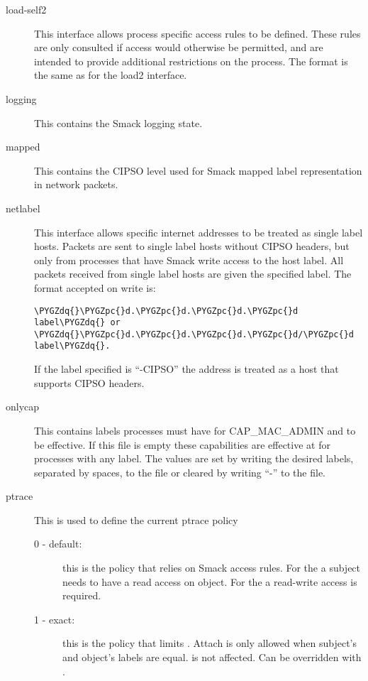 \documentclass[a4paper,8pt,english]{sphinxmanual}
\def\PYGZpc{\char`\%}
\def\PYGZdq{\char`\"}
\begin{document}
\begin{description}
\item[{load-self2}] \leavevmode
This interface allows process specific access rules to be
defined. These rules are only consulted if access would
otherwise be permitted, and are intended to provide additional
restrictions on the process. The format is the same as for
the load2 interface.

\item[{logging}] \leavevmode
This contains the Smack logging state.

\item[{mapped}] \leavevmode
This contains the CIPSO level used for Smack mapped label
representation in network packets.

\item[{netlabel}] \leavevmode
This interface allows specific internet addresses to be
treated as single label hosts. Packets are sent to single
label hosts without CIPSO headers, but only from processes
that have Smack write access to the host label. All packets
received from single label hosts are given the specified
label. The format accepted on write is:

\begin{Verbatim}[commandchars=\\\{\}]
\PYGZdq{}\PYGZpc{}d.\PYGZpc{}d.\PYGZpc{}d.\PYGZpc{}d label\PYGZdq{} or \PYGZdq{}\PYGZpc{}d.\PYGZpc{}d.\PYGZpc{}d.\PYGZpc{}d/\PYGZpc{}d label\PYGZdq{}.
\end{Verbatim}

If the label specified is ``-CIPSO'' the address is treated
as a host that supports CIPSO headers.

\item[{onlycap}] \leavevmode
This contains labels processes must have for CAP\_MAC\_ADMIN
and  to be effective. If this file is empty
these capabilities are effective at for processes with any
label. The values are set by writing the desired labels, separated
by spaces, to the file or cleared by writing ``-'' to the file.

\item[{ptrace}] \leavevmode
This is used to define the current ptrace policy
\begin{description}
\item[{0 - default:}] \leavevmode
this is the policy that relies on Smack access rules.
For the  a subject needs to have a read access on
object. For the  a read-write access is required.

\item[{1 - exact:}] \leavevmode
this is the policy that limits . Attach is
only allowed when subject's and object's labels are equal.
 is not affected. Can be overridden with .


\end{description}
\end{description}
\end{document}
